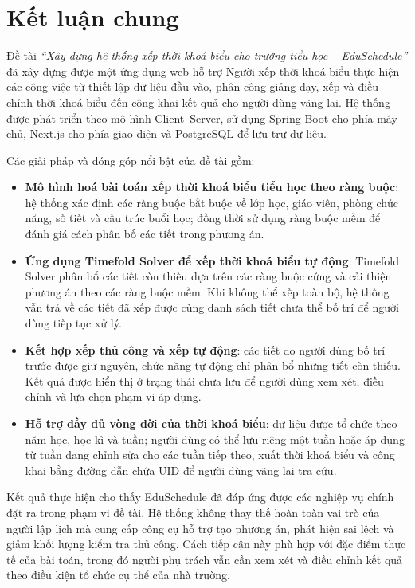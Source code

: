 \documentclass[../DoAn.tex]{subfiles}
\begin{document}
\section{Kết luận chung}
\label{section:5.1}

Đề tài \textit{``Xây dựng hệ thống xếp thời khoá biểu cho trường tiểu
học -- EduSchedule''} đã xây dựng được một ứng dụng web hỗ trợ Người xếp thời
khoá biểu thực hiện các công việc từ thiết lập dữ liệu đầu vào, phân công giảng
dạy, xếp và điều chỉnh thời khoá biểu đến công khai kết quả cho người dùng vãng
lai. Hệ thống được phát triển theo mô hình Client--Server, sử dụng Spring Boot
cho phía máy chủ, Next.js cho phía giao diện và PostgreSQL để lưu trữ dữ liệu.

Các giải pháp và đóng góp nổi bật của đề tài gồm:

\begin{itemize}[noitemsep]
    \item \textbf{Mô hình hoá bài toán xếp thời khoá biểu tiểu học theo ràng
    buộc}: hệ thống xác định các ràng buộc bắt buộc về lớp học, giáo viên, phòng
    chức năng, số tiết và cấu trúc buổi học; đồng thời sử dụng ràng buộc mềm để
    đánh giá cách phân bố các tiết trong phương án.
    \item \textbf{Ứng dụng Timefold Solver để xếp thời khoá biểu tự động}:
    Timefold Solver phân bổ các tiết còn thiếu dựa trên các ràng buộc cứng và
    cải thiện phương án theo các ràng buộc mềm. Khi không thể xếp toàn bộ, hệ
    thống vẫn trả về các tiết đã xếp được cùng danh sách tiết chưa thể bố trí để
    người dùng tiếp tục xử lý.
    \item \textbf{Kết hợp xếp thủ công và xếp tự động}: các tiết do người dùng
    bố trí trước được giữ nguyên, chức năng tự động chỉ phân bổ những tiết còn
    thiếu. Kết quả được hiển thị ở trạng thái chưa lưu để người dùng xem xét,
    điều chỉnh và lựa chọn phạm vi áp dụng.
    \item \textbf{Hỗ trợ đầy đủ vòng đời của thời khoá biểu}: dữ liệu được tổ
    chức theo năm học, học kì và tuần; người dùng có thể lưu riêng một tuần hoặc
    áp dụng từ tuần đang chỉnh sửa cho các tuần tiếp theo, xuất thời khoá biểu
    và công khai bằng đường dẫn chứa UID để người dùng vãng lai tra cứu.
\end{itemize}

Kết quả thực hiện cho thấy EduSchedule đã đáp ứng được các nghiệp vụ chính đặt
ra trong phạm vi đề tài. Hệ thống không thay thế hoàn toàn vai trò của người lập
lịch mà cung cấp công cụ hỗ trợ tạo phương án, phát hiện sai lệch và giảm khối
lượng kiểm tra thủ công. Cách tiếp cận này phù hợp với đặc điểm thực tế của bài
toán, trong đó người phụ trách vẫn cần xem xét và điều chỉnh kết quả theo điều
kiện tổ chức cụ thể của nhà trường.
\end{document}
